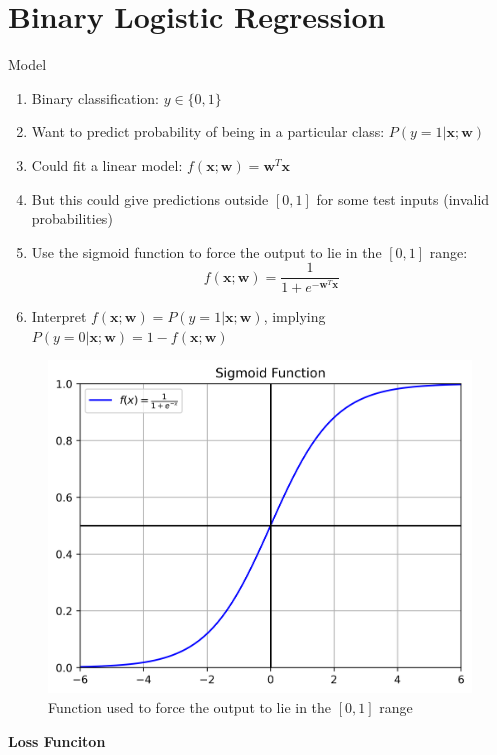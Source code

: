 \documentclass[a4paper, 11pt]{article}
\begin{document}
\section{Binary Logistic Regression}
\begin{center}
        \Large Model
\end{center}

\begin{enumerate}
        \item Binary classification: $y\in\{0,1\}$
        \item Want to predict probability of being in a particular class: $P(y = 1|\mathbf{x};\mathbf{w})$
        \item Could fit a linear model: $f(\mathbf{x};\mathbf{w}) = \mathbf{w}^{T}\mathbf{x}$
        \item But this could give predictions outside $[0,1]$ for some test inputs (invalid probabilities)
        \item Use the sigmoid function to force the output to lie in the $[0,1]$ range:\[f(\mathbf{x};\mathbf{w}) = \frac{1}{1 + e^{-\mathbf{w}^{T}\mathbf{x}}}\]
        \item Interpret $f(\mathbf{x}; \mathbf{w}) = P(y = 1|\mathbf{x};\mathbf{w})$, implying $P(y = 0|\mathbf{x};\mathbf{w}) = 1 - f(\mathbf{x};\mathbf{w})$
\end{enumerate}

\begin{figure}[H]
        \centering
        \includegraphics[scale=0.8]{sigmoid.png}
        \caption{Function used to force the output to lie in the $[0,1]$ range}
        \label{fig: Sigmoid Function}
\end{figure}
\newpage
{\Large \textbf{Loss Funciton}}
\end{document}
